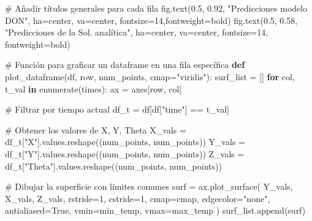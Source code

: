 \documentclass[
  spanish,
  us-letterpaper,
]{scrreprt}
\newenvironment{Shaded}{\begin{snugshade}}{\end{snugshade}}
\newcommand{\BuiltInTok}[1]{\textcolor[rgb]{0.00,0.23,0.31}{#1}}
\newcommand{\CommentTok}[1]{\textcolor[rgb]{0.37,0.37,0.37}{#1}}
\newcommand{\ControlFlowTok}[1]{\textcolor[rgb]{0.00,0.23,0.31}{\textbf{#1}}}
\newcommand{\DecValTok}[1]{\textcolor[rgb]{0.68,0.00,0.00}{#1}}
\newcommand{\FloatTok}[1]{\textcolor[rgb]{0.68,0.00,0.00}{#1}}
\newcommand{\KeywordTok}[1]{\textcolor[rgb]{0.00,0.23,0.31}{\textbf{#1}}}
\newcommand{\NormalTok}[1]{\textcolor[rgb]{0.00,0.23,0.31}{#1}}
\newcommand{\OperatorTok}[1]{\textcolor[rgb]{0.37,0.37,0.37}{#1}}
\newcommand{\StringTok}[1]{\textcolor[rgb]{0.13,0.47,0.30}{#1}}
\newcommand{\VariableTok}[1]{\textcolor[rgb]{0.07,0.07,0.07}{#1}}
\theoremstyle{definition}
\theoremstyle{plain}
\theoremstyle{remark}
\begin{document}
\begin{Shaded}
\begin{Highlighting}[]
\CommentTok{\# Añadir títulos generales para cada fila}
\NormalTok{fig.text(}\FloatTok{0.5}\NormalTok{, }\FloatTok{0.92}\NormalTok{, }\StringTok{"Predicciones modelo DON"}\NormalTok{, }
\NormalTok{        ha}\OperatorTok{=}\StringTok{\textquotesingle{}center\textquotesingle{}}\NormalTok{, va}\OperatorTok{=}\StringTok{\textquotesingle{}center\textquotesingle{}}\NormalTok{, fontsize}\OperatorTok{=}\DecValTok{14}\NormalTok{,fontweight}\OperatorTok{=}\StringTok{\textquotesingle{}bold\textquotesingle{}}\NormalTok{)}
\NormalTok{fig.text(}\FloatTok{0.5}\NormalTok{, }\FloatTok{0.58}\NormalTok{, }\StringTok{"Predicciones de la Sol. analítica"}\NormalTok{,}
\NormalTok{        ha}\OperatorTok{=}\StringTok{\textquotesingle{}center\textquotesingle{}}\NormalTok{, va}\OperatorTok{=}\StringTok{\textquotesingle{}center\textquotesingle{}}\NormalTok{, fontsize}\OperatorTok{=}\DecValTok{14}\NormalTok{, fontweight}\OperatorTok{=}\StringTok{\textquotesingle{}bold\textquotesingle{}}\NormalTok{)}

\CommentTok{\# Función para graficar un dataframe en una fila específica}
\KeywordTok{def}\NormalTok{ plot\_dataframe(df, row, num\_points, cmap}\OperatorTok{=}\StringTok{"viridis"}\NormalTok{):}
\NormalTok{    surf\_list }\OperatorTok{=}\NormalTok{ []}
    \ControlFlowTok{for}\NormalTok{ col, t\_val }\KeywordTok{in} \BuiltInTok{enumerate}\NormalTok{(times):}
\NormalTok{        ax }\OperatorTok{=}\NormalTok{ axes[row, col]}
        
        \CommentTok{\# Filtrar por tiempo actual}
\NormalTok{        df\_t }\OperatorTok{=}\NormalTok{ df[df[}\StringTok{"time"}\NormalTok{] }\OperatorTok{==}\NormalTok{ t\_val]}

        \CommentTok{\# Obtener los valores de X, Y, Theta}
\NormalTok{        X\_vals }\OperatorTok{=}\NormalTok{ df\_t[}\StringTok{"X"}\NormalTok{].values.reshape((num\_points, num\_points))}
\NormalTok{        Y\_vals }\OperatorTok{=}\NormalTok{ df\_t[}\StringTok{"Y"}\NormalTok{].values.reshape((num\_points, num\_points))}
\NormalTok{        Z\_vals }\OperatorTok{=}\NormalTok{ df\_t[}\StringTok{"Theta"}\NormalTok{].values.reshape((num\_points, num\_points))}

        \CommentTok{\# Dibujar la superficie con límites comunes}
\NormalTok{        surf }\OperatorTok{=}\NormalTok{ ax.plot\_surface(}
\NormalTok{            Y\_vals, X\_vals, Z\_vals,}
\NormalTok{            rstride}\OperatorTok{=}\DecValTok{1}\NormalTok{, cstride}\OperatorTok{=}\DecValTok{1}\NormalTok{,}
\NormalTok{            cmap}\OperatorTok{=}\NormalTok{cmap,}
\NormalTok{            edgecolor}\OperatorTok{=}\StringTok{"none"}\NormalTok{,}
\NormalTok{            antialiased}\OperatorTok{=}\VariableTok{True}\NormalTok{,}
\NormalTok{            vmin}\OperatorTok{=}\NormalTok{min\_temp,}
\NormalTok{            vmax}\OperatorTok{=}\NormalTok{max\_temp}
\NormalTok{        )}
\NormalTok{        surf\_list.append(surf)}


\end{Highlighting}
\end{Shaded}
\end{document}
